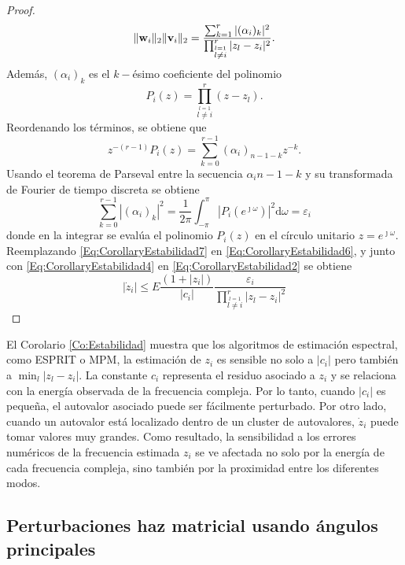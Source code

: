 \begin{proof}
			\begin{equation}
				\|\mathbf{w}_i\|_2\|\mathbf{v}_i\|_2 = \frac{\sum_{k=1}^{r}|(\alpha_i)_k|^2}{\prod_{\stackrel{l=1}{l\neq i}}^r|z_l-z_i|^2}.
				\label{Eq:CorollaryEstabilidad6}
			\end{equation}
			Además, $(\alpha_i)_k$ es el $k-$ésimo coeficiente del polinomio
			\[P_i(z) = \prod_{\stackrel{l=1}{l\neq i}}^r(z-z_l).\]
			Reordenando los términos, se obtiene que
			\[z^{-(r-1)}P_i(z) = \sum_{k=0}^{r-1}(\alpha_i)_{n-1-k}z^{-k}.\]
			Usando el teorema de Parseval entre la secuencia $\alpha_i{n-1-k}$ y su transformada de Fourier de tiempo discreta se obtiene
			\begin{equation}
				\sum_{k=0}^{r-1}|(\alpha_i)_k|^2 = \frac{1}{2\pi}\int_{-\pi}^{\pi}|P_i(e^{\jmath\omega})|^2\mathrm{d}\omega = \varepsilon_i
				\label{Eq:CorollaryEstabilidad7}
			\end{equation}
			donde en la integrar se evalúa el polinomio $P_i(z)$ en el círculo unitario $z=e^{\jmath\omega}$. Reemplazando \eqref{Eq:CorollaryEstabilidad7} en \eqref{Eq:CorollaryEstabilidad6}, y junto con \eqref{Eq:CorollaryEstabilidad4} en \eqref{Eq:CorollaryEstabilidad2} se obtiene
			\begin{equation}
				|\dot{z}_i|\le E\frac{(1+|z_i|)}{|c_i|}\frac{\varepsilon_i}{\prod_{\stackrel{l=1}{l\neq i}}^r|z_l-z_i|^2}
				\label{Eq:CorollaryEstabilidad8}
			\end{equation}
		\end{proof}
	
		El Corolario \eqref{Co:Estabilidad} muestra que los algoritmos de estimación espectral, como ESPRIT o MPM, la estimación de $z_i$ es sensible no solo a $|c_i|$ pero también a $\min_l|z_l-z_i|$. La constante $c_i$ representa el residuo asociado a $z_i$ y se relaciona con la energía observada de la frecuencia compleja. Por lo tanto, cuando $|c_i|$ es pequeña, el autovalor asociado puede ser fácilmente perturbado. Por otro lado, cuando un autovalor está localizado dentro de un cluster de autovalores, $\dot{z}_i$ puede tomar valores muy grandes. Como resultado, la sensibilidad a los errores numéricos de la frecuencia estimada $z_i$ se ve afectada no solo por la energía de cada frecuencia compleja, sino también por la proximidad entre los diferentes modos. 
		
		
	\subsection{Perturbaciones haz matricial usando ángulos principales}
	
